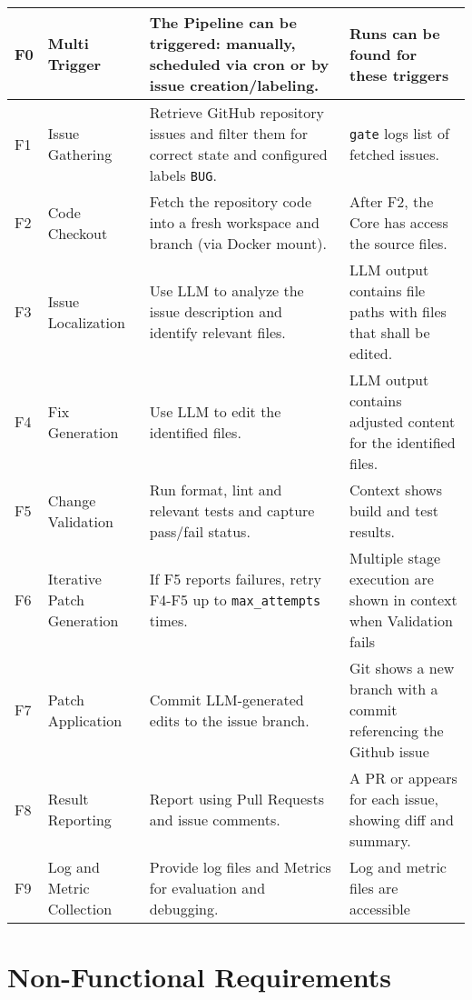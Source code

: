 \begin{longtable}{@{\extracolsep{\fill}} p{0.5cm} | p{3cm} | p{6cm} | p{4cm} @{}}
    \hline
    \endfoot
        F0 \label{f0} & Multi Trigger
        & The Pipeline can be triggered: manually, scheduled via cron or by issue creation/labeling.
        & Runs can be found for these triggers \\ \hline
        F1 \label{f1} & Issue Gathering
        & Retrieve GitHub repository issues and filter them for correct state and configured labels \texttt{BUG}.
        & \texttt{gate} logs list of fetched issues.  \\ \hline
        F2 \label{f2} & Code Checkout
        & Fetch the repository code into a fresh workspace and branch (via Docker mount).
        & After F2, the Core has access the source files. \\\hline
        F3 \label{f3} & Issue Localization
        & Use LLM to analyze the issue description and identify relevant files.
        & LLM output contains file paths with files that shall be edited. \\\hline
        F4 \label{f4} & Fix Generation
        & Use LLM to edit the identified files.
        & LLM output contains adjusted content for the identified files. \\\hline
        F5 \label{f5} & Change Validation
        & Run format, lint and relevant tests and capture pass/fail status.
        & Context shows build and test results. \\\hline
        F6 \label{f6} & Iterative Patch Generation
        & If F5 reports failures, retry F4-F5 up to \texttt{max\_attempts} times.
        & Multiple stage execution are shown in context when Validation fails \\\hline
        F7 \label{f7} & Patch Application
        & Commit LLM-generated edits to the issue branch.
        & Git shows a new branch with a commit referencing the Github issue \\\hline
        F8 \label{f8} & Result Reporting
        & Report using Pull Requests and issue comments.
        & A PR or appears for each issue, showing diff and summary. \\\hline
        F9 \label{f9} & Log and Metric Collection
        & Provide log files and Metrics for evaluation and debugging.
        & Log and metric files are accessible \\
\end{longtable}

\section{Non-Functional Requirements}

